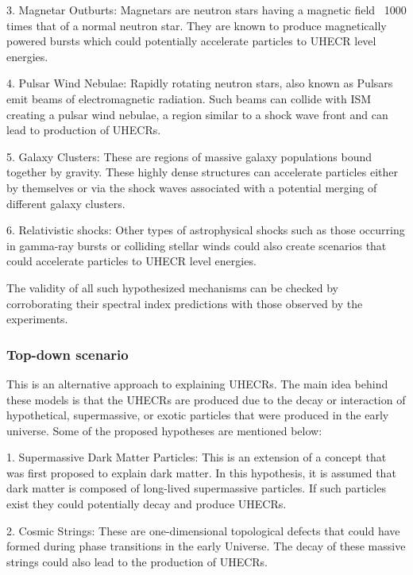 3. Magnetar Outburts: Magnetars are neutron stars having a magnetic field ~1000 times that of a normal neutron star. They are known to produce magnetically powered bursts which could potentially accelerate particles to UHECR level energies.~\cite{PhysRevD.84.023002}

4. Pulsar Wind Nebulae: Rapidly rotating neutron stars, also known as Pulsars emit beams of electromagnetic radiation. Such beams can collide with ISM creating a pulsar wind nebulae, a region similar to a shock wave front and can lead to production of UHECRs.~\cite{Cerutti_2020}

5. Galaxy Clusters: These are regions of massive galaxy populations bound together by gravity. These highly dense structures can accelerate particles either by themselves or via the shock waves associated with a potential merging of different galaxy clusters.~\cite{Murase_2008,Condorelli_2023} 

6. Relativistic shocks: Other types of astrophysical shocks such as those occurring in gamma-ray bursts or colliding stellar winds could also create scenarios that could accelerate particles to UHECR level energies.~\cite{Kirk_2000,10.1046/j.1365-8711.2001.04851.x}

The validity of all such hypothesized mechanisms can be checked by corroborating their spectral index predictions with those observed by the experiments. 

\subsubsection{Top-down scenario}
\label{subsec:Tdownsce}
This is an alternative approach to explaining UHECRs. The main idea behind these models is that the UHECRs are produced due to the decay or interaction of hypothetical, supermassive, or exotic particles that were produced in the early universe. Some of the proposed hypotheses are mentioned below:

1. Supermassive Dark Matter Particles: This is an extension of a concept that was first proposed to explain dark matter. In this hypothesis, it is assumed that dark matter is composed of long-lived supermassive particles. If such particles exist they could potentially decay and produce UHECRs.~\cite{ALOISIO2008307,MARZOLA201756}

2. Cosmic Strings: These are one-dimensional topological defects that could have formed during phase transitions in the early Universe. The decay of these massive strings could also lead to the production of UHECRs.~\cite{BHATTACHARJEE2000109,PhysRevD.64.043004}

